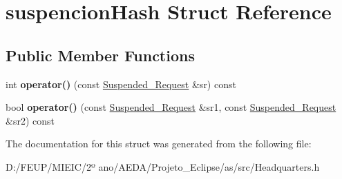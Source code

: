 \hypertarget{structsuspencion_hash}{}\section{suspencion\+Hash Struct Reference}
\label{structsuspencion_hash}
\subsection*{Public Member Functions}
\begin{DoxyCompactItemize}
\item 
\mbox{\label{structsuspencion_hash_ac184d3b9e846faa5895a390c08f87851}} 
int {\bfseries operator()} (const \hyperlink{class_suspended___request}{Suspended\+\_\+\+Request} \&sr) const
\item 
\mbox{\label{structsuspencion_hash_a4da3e8172c9276e1a93952cae6406d2e}} 
bool {\bfseries operator()} (const \hyperlink{class_suspended___request}{Suspended\+\_\+\+Request} \&sr1, const \hyperlink{class_suspended___request}{Suspended\+\_\+\+Request} \&sr2) const
\end{DoxyCompactItemize}


The documentation for this struct was generated from the following file\+:\begin{DoxyCompactItemize}
\item 
D\+:/\+F\+E\+U\+P/\+M\+I\+E\+I\+C/2º ano/\+A\+E\+D\+A/\+Projeto\+\_\+\+Eclipse/as/src/Headquarters.\+h\end{DoxyCompactItemize}
